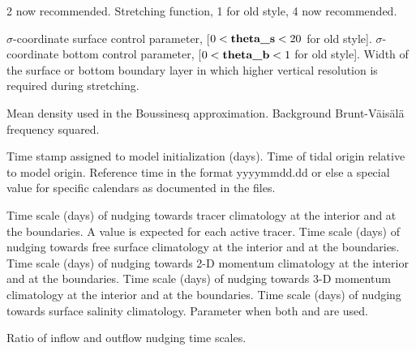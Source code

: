 \begin{klist}
\begin{klist}
       2 now recommended.
        Stretching function, 1 for old style, 4
       now recommended.
     \end{klist}
    \mbox{}
     \begin{klist}
         $\sigma$-coordinate surface control parameter,
     [$0 < \mbox{\bf theta\_s} < 20$ for old style].
         $\sigma$-coordinate bottom  control parameter,
     [$0 < \mbox{\bf theta\_b} < 1$ for old style].
          Width of the surface or bottom boundary layer
     in which higher vertical resolution is required during stretching.
     \end{klist}
    \mbox{}
     \begin{klist}
            Mean density used in the Boussinesq
     approximation.
        Background Brunt-V\"ais\"al\"a frequency squared.
     \end{klist}
    \mbox{}
     \begin{klist}
          Time stamp assigned to model initialization
     (days).
          Time of tidal origin relative to model
       origin.
         Reference time in the format yyyymmdd.dd or
       else a special value for specific calendars as documented in the
        files.
     \end{klist}
   \mbox{}
     \begin{klist}
           Time scale (days) of nudging towards
     tracer climatology at the interior and at the boundaries.
     A value is expected for each active tracer.
           Time scale (days) of nudging towards
     free surface climatology at the interior and at the boundaries.
           Time scale (days) of nudging towards
     2-D momentum climatology at the interior and at the boundaries.
           Time scale (days) of nudging towards
     3-D momentum climatology at the interior and at the boundaries.
           Time scale (days) of nudging towards
     surface salinity climatology.
        Parameter when both
      and  are used.
     \end{klist}
    \mbox{}
     \begin{klist}
          Ratio of inflow and outflow nudging time scales.

\end{klist}
\end{klist}
